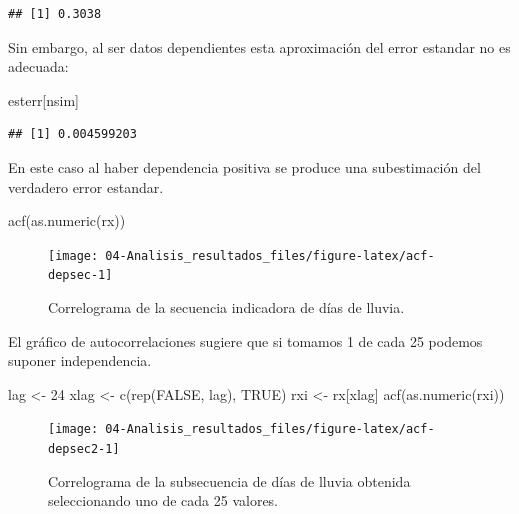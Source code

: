 \documentclass[
]{book}
\newenvironment{Shaded}{\begin{snugshade}}{\end{snugshade}}
\newcommand{\ConstantTok}[1]{\textcolor[rgb]{0.00,0.00,0.00}{#1}}
\newcommand{\DecValTok}[1]{\textcolor[rgb]{0.00,0.00,0.81}{#1}}
\newcommand{\FunctionTok}[1]{\textcolor[rgb]{0.00,0.00,0.00}{#1}}
\newcommand{\NormalTok}[1]{#1}
\newcommand{\OtherTok}[1]{\textcolor[rgb]{0.56,0.35,0.01}{#1}}
\theoremstyle{break}
\theoremstyle{definition}
\theoremstyle{definition}
\theoremstyle{definition}
\theoremstyle{definition}
\theoremstyle{remark}
\begin{document}
\begin{verbatim}
## [1] 0.3038
\end{verbatim}

Sin embargo, al ser datos dependientes esta aproximación del error estandar no es adecuada:

\begin{Shaded}
\begin{Highlighting}[]
\NormalTok{esterr[nsim]}
\end{Highlighting}
\end{Shaded}

\begin{verbatim}
## [1] 0.004599203
\end{verbatim}

En este caso al haber dependencia positiva se produce una
subestimación del verdadero error estandar.

\begin{Shaded}
\begin{Highlighting}[]
\FunctionTok{acf}\NormalTok{(}\FunctionTok{as.numeric}\NormalTok{(rx))}
\end{Highlighting}
\end{Shaded}

\begin{figure}[!htb]

{\centering \texttt{[image: 04-Analisis\_resultados\_files/figure-latex/acf-depsec-1]} 

}

\caption{Correlograma de la secuencia indicadora de días de lluvia.}\label{fig:acf-depsec}
\end{figure}

El gráfico de autocorrelaciones sugiere que si tomamos 1 de cada 25
podemos suponer independencia.

\begin{Shaded}
\begin{Highlighting}[]
\NormalTok{lag }\OtherTok{\textless{}{-}} \DecValTok{24}
\NormalTok{xlag }\OtherTok{\textless{}{-}} \FunctionTok{c}\NormalTok{(}\FunctionTok{rep}\NormalTok{(}\ConstantTok{FALSE}\NormalTok{, lag), }\ConstantTok{TRUE}\NormalTok{)}
\NormalTok{rxi }\OtherTok{\textless{}{-}}\NormalTok{ rx[xlag]}
\FunctionTok{acf}\NormalTok{(}\FunctionTok{as.numeric}\NormalTok{(rxi))}
\end{Highlighting}
\end{Shaded}

\begin{figure}[!htb]

{\centering \texttt{[image: 04-Analisis\_resultados\_files/figure-latex/acf-depsec2-1]} 

}

\caption{Correlograma de la subsecuencia de días de lluvia obtenida seleccionando uno de cada 25 valores.}\label{fig:acf-depsec2}
\end{figure}
\end{document}
